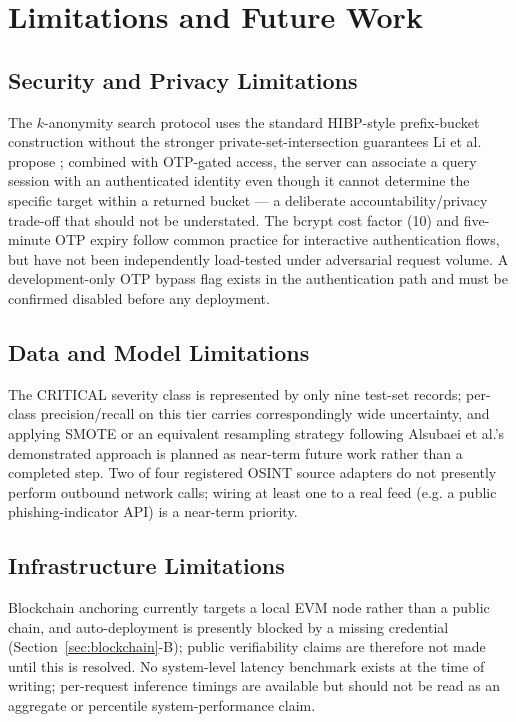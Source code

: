 \documentclass[conference]{IEEEtran}
\begin{document}
\section{Limitations and Future Work}
\label{sec:limitations}

\subsection{Security and Privacy Limitations}
The $k$-anonymity search protocol uses the standard HIBP-style prefix-bucket construction without the stronger private-set-intersection guarantees Li et al. propose \cite{li2019protocols}; combined with OTP-gated access, the server can associate a query session with an authenticated identity even though it cannot determine the specific target within a returned bucket --- a deliberate accountability/privacy trade-off that should not be understated. The bcrypt cost factor (10) and five-minute OTP expiry follow common practice for interactive authentication flows, but have not been independently load-tested under adversarial request volume. A development-only OTP bypass flag exists in the authentication path and must be confirmed disabled before any deployment.

\subsection{Data and Model Limitations}
The CRITICAL severity class is represented by only nine test-set records; per-class precision/recall on this tier carries correspondingly wide uncertainty, and applying SMOTE or an equivalent resampling strategy following Alsubaei et al.'s demonstrated approach \cite{alsubaei2024enhancing} is planned as near-term future work rather than a completed step. Two of four registered OSINT source adapters do not presently perform outbound network calls; wiring at least one to a real feed (e.g. a public phishing-indicator API) is a near-term priority.

\subsection{Infrastructure Limitations}
Blockchain anchoring currently targets a local EVM node rather than a public chain, and auto-deployment is presently blocked by a missing credential (Section~\ref{sec:blockchain}-B); public verifiability claims are therefore not made until this is resolved. No system-level latency benchmark exists at the time of writing; per-request inference timings are available but should not be read as an aggregate or percentile system-performance claim.
\end{document}
